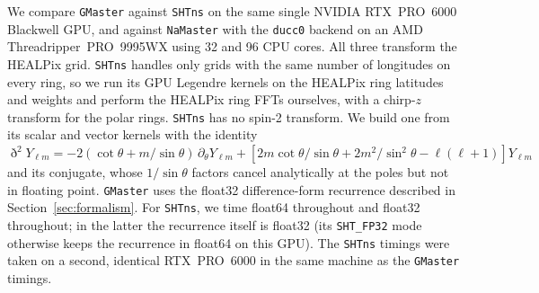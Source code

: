 \documentclass[letters,usenatbib,useAMS]{mnras}
\begin{document}
We compare \texttt{GMaster} against \texttt{SHTns} on the same single NVIDIA RTX~PRO~6000 Blackwell GPU, and against \texttt{NaMaster} with the \texttt{ducc0} backend on an AMD Threadripper~PRO~9995WX using 32 and 96 CPU cores. All three transform the HEALPix grid. \texttt{SHTns} handles only grids with the same number of longitudes on every ring, so we run its GPU Legendre kernels on the HEALPix ring latitudes and weights and perform the HEALPix ring FFTs ourselves, with a chirp-$z$ transform for the polar rings. \texttt{SHTns} has no spin-2 transform. We build one from its scalar and vector kernels with the identity $\eth^2 Y_{\ell m}=-2(\cot\theta+m/\sin\theta)\,\partial_\theta Y_{\ell m}+\left[2m\cot\theta/\sin\theta+2m^2/\sin^2\theta-\ell(\ell+1)\right]Y_{\ell m}$ and its conjugate, whose $1/\sin\theta$ factors cancel analytically at the poles but not in floating point. \texttt{GMaster} uses the float32 difference-form recurrence described in Section~\ref{sec:formalism}. For \texttt{SHTns}, we time float64 throughout and float32 throughout; in the latter the recurrence itself is float32 (its \texttt{SHT\_FP32} mode otherwise keeps the recurrence in float64 on this GPU). The \texttt{SHTns} timings were taken on a second, identical RTX~PRO~6000 in the same machine as the \texttt{GMaster} timings.

\end{document}
